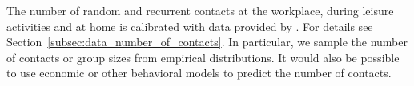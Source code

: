The number of random and recurrent contacts at the workplace, during leisure activities
and at home is calibrated with data provided by \citet{Mossong2008}. For details see
Section~\ref{subsec:data_number_of_contacts}. In particular, we sample the number of
contacts or group sizes from empirical distributions. It would also be possible to use
economic or other behavioral models to predict the number of contacts.

